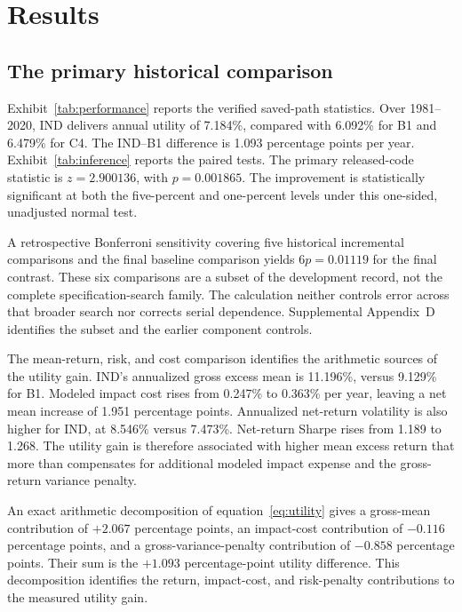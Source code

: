 \documentclass[12pt,letterpaper,fleqn]{article}
\begin{document}
\FloatBarrier
\section{Results}\label{sec:results}
\subsection{The primary historical comparison}
Exhibit~\ref{tab:performance} reports the verified saved-path statistics. Over 1981--2020, IND delivers annual utility of 7.184\%, compared with 6.092\% for B1 and 6.479\% for C4. The IND--B1 difference is 1.093 percentage points per year. Exhibit~\ref{tab:inference} reports the paired tests. The primary released-code statistic is $z=2.900136$, with $p=0.001865$. The improvement is statistically significant at both the five-percent and one-percent levels under this one-sided, unadjusted normal test.

A retrospective Bonferroni sensitivity covering five historical incremental comparisons and the final baseline comparison yields $6p=0.01119$ for the final contrast. These six comparisons are a subset of the development record, not the complete specification-search family. The calculation neither controls error across that broader search nor corrects serial dependence. Supplemental Appendix~D identifies the subset and the earlier component controls.

The mean-return, risk, and cost comparison identifies the arithmetic sources of the utility gain. IND's annualized gross excess mean is 11.196\%, versus 9.129\% for B1. Modeled impact cost rises from 0.247\% to 0.363\% per year, leaving a net mean increase of 1.951 percentage points. Annualized net-return volatility is also higher for IND, at 8.546\% versus 7.473\%. Net-return Sharpe rises from 1.189 to 1.268. The utility gain is therefore associated with higher mean excess return that more than compensates for additional modeled impact expense and the gross-return variance penalty.

An exact arithmetic decomposition of equation~\eqref{eq:utility} gives a gross-mean contribution of $+2.067$ percentage points, an impact-cost contribution of $-0.116$ percentage points, and a gross-variance-penalty contribution of $-0.858$ percentage points. Their sum is the $+1.093$ percentage-point utility difference. This decomposition identifies the return, impact-cost, and risk-penalty contributions to the measured utility gain.
\end{document}
